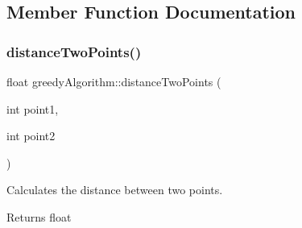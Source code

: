 \subsection{Member Function Documentation}
\mbox{\label{classgreedyAlgorithm_a59dd977d1c232276b8494de999e415d4}} 
\subsubsection{\texorpdfstring{distance\+Two\+Points()}{distanceTwoPoints()}}
{\footnotesize\ttfamily float greedy\+Algorithm\+::distance\+Two\+Points (\begin{DoxyParamCaption}\item[{int}]{point1,  }\item[{int}]{point2 }\end{DoxyParamCaption})}



Calculates the distance between two points. 

\begin{DoxyReturn}{Returns}
float 
\end{DoxyReturn}

